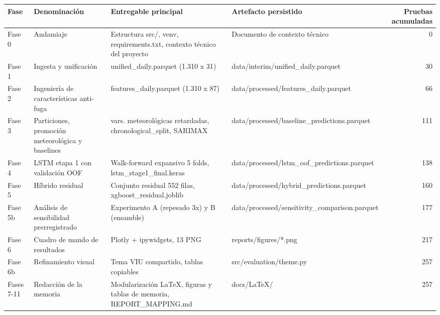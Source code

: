 \begin{tabular}{p{1.7cm}>{\raggedright\arraybackslash}p{2.7cm}>{\raggedright\arraybackslash}p{4.3cm}>{\raggedright\arraybackslash}p{4.3cm}r}
\toprule
\rowcolor{naranja}
\textbf{Fase} & \textbf{Denominación} & \textbf{Entregable principal} & \textbf{Artefacto persistido} & \textbf{Pruebas acumuladas} \\
\midrule
\rowcolor{filaclara} Fase 0 & Andamiaje & Estructura src/\allowbreak{}, venv, requirements.txt, contexto técnico del proyecto & Documento de contexto técnico & 0 \\
Fase 1 & Ingesta y unificación & unified\_\allowbreak{}daily.parquet (1.310 x 31) & data/\allowbreak{}interim/\allowbreak{}unified\_\allowbreak{}daily.parquet & 30 \\
\rowcolor{filaclara} Fase 2 & Ingeniería de características anti-fuga & features\_\allowbreak{}daily.parquet (1.310 x 87) & data/\allowbreak{}processed/\allowbreak{}features\_\allowbreak{}daily.parquet & 66 \\
Fase 3 & Particiones, promoción meteorológica y baselines & 105 vars. meteorológicas retardadas, chronological\_\allowbreak{}split, SARIMAX & data/\allowbreak{}processed/\allowbreak{}baseline\_\allowbreak{}predictions.parquet & 111 \\
\rowcolor{filaclara} Fase 4 & LSTM etapa 1 con validación OOF & Walk-forward expansivo 5 folds, lstm\_\allowbreak{}stage1\_\allowbreak{}final.keras & data/\allowbreak{}processed/\allowbreak{}lstm\_\allowbreak{}oof\_\allowbreak{}predictions.parquet & 138 \\
Fase 5 & Híbrido residual & Conjunto residual 552 filas, xgboost\_\allowbreak{}residual.joblib & data/\allowbreak{}processed/\allowbreak{}hybrid\_\allowbreak{}predictions.parquet & 160 \\
\rowcolor{filaclara} Fase 5b & Análisis de sensibilidad prerregistrado & Experimento A (repesado 3x) y B (ensamble) & data/\allowbreak{}processed/\allowbreak{}sensitivity\_\allowbreak{}comparison.parquet & 177 \\
Fase 6 & Cuadro de mando de resultados & Plotly + ipywidgets, 13 PNG & reports/\allowbreak{}figures/\allowbreak{}*.png & 217 \\
\rowcolor{filaclara} Fase 6b & Refinamiento visual & Tema VIU compartido, tablas copiables & src/\allowbreak{}evaluation/\allowbreak{}theme.py & 257 \\
Fases 7-11 & Redacción de la memoria & Modularización LaTeX, figuras y tablas de memoria, REPORT\_\allowbreak{}MAPPING.md & docs/\allowbreak{}LaTeX/\allowbreak{} & 257 \\
\bottomrule
\end{tabular}
